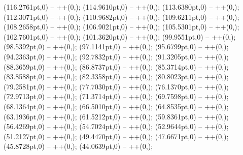 {   (116.2761pt,0) -- ++(0,\centesimos);
   (114.9610pt,0) -- ++(0,\centesimos);
   (113.6380pt,0) -- ++(0,\centesimos);
   (112.3071pt,0) -- ++(0,\centesimos);
   (110.9682pt,0) -- ++(0,\centesimos);
   (109.6211pt,0) -- ++(0,\centesimos);
   (108.2658pt,0) -- ++(0,\centesimos);
   (106.9021pt,0) -- ++(0,\centesimos);
   (105.5301pt,0) -- ++(0,\centesimos);
   (102.7601pt,0) -- ++(0,\centesimos);
   (101.3620pt,0) -- ++(0,\centesimos);
   (99.9551pt,0) -- ++(0,\centesimos);
   (98.5392pt,0) -- ++(0,\centesimos);
   (97.1141pt,0) -- ++(0,\centesimos);
   (95.6799pt,0) -- ++(0,\centesimos);
   (94.2363pt,0) -- ++(0,\centesimos);
   (92.7832pt,0) -- ++(0,\centesimos);
   (91.3205pt,0) -- ++(0,\centesimos);
   (88.3659pt,0) -- ++(0,\centesimos);
   (86.8737pt,0) -- ++(0,\centesimos);
   (85.3714pt,0) -- ++(0,\centesimos);
   (83.8588pt,0) -- ++(0,\centesimos);
   (82.3358pt,0) -- ++(0,\centesimos);
   (80.8023pt,0) -- ++(0,\centesimos);
   (79.2581pt,0) -- ++(0,\centesimos);
   (77.7030pt,0) -- ++(0,\centesimos);
   (76.1370pt,0) -- ++(0,\centesimos);
   (72.9713pt,0) -- ++(0,\centesimos);
   (71.3714pt,0) -- ++(0,\centesimos);
   (69.7598pt,0) -- ++(0,\centesimos);
   (68.1364pt,0) -- ++(0,\centesimos);
   (66.5010pt,0) -- ++(0,\centesimos);
   (64.8535pt,0) -- ++(0,\centesimos);
   (63.1936pt,0) -- ++(0,\centesimos);
   (61.5212pt,0) -- ++(0,\centesimos);
   (59.8361pt,0) -- ++(0,\centesimos);
   (56.4269pt,0) -- ++(0,\centesimos);
   (54.7024pt,0) -- ++(0,\centesimos);
   (52.9644pt,0) -- ++(0,\centesimos);
   (51.2127pt,0) -- ++(0,\centesimos);
   (49.4470pt,0) -- ++(0,\centesimos);
   (47.6671pt,0) -- ++(0,\centesimos);
   (45.8728pt,0) -- ++(0,\centesimos);
   (44.0639pt,0) -- ++(0,\centesimos);
}
